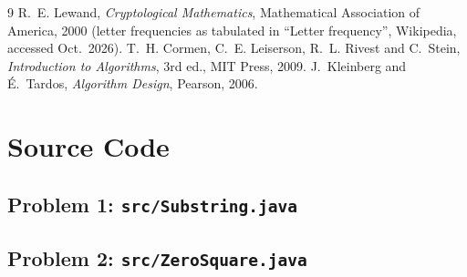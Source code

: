 \documentclass[11pt]{article}
\begin{document}
\begin{thebibliography}{9}
 R.~E. Lewand, \emph{Cryptological Mathematics}, Mathematical Association of America, 2000 (letter frequencies as tabulated in ``Letter frequency'', Wikipedia, accessed Oct.\ 2026).
 T.~H. Cormen, C.~E. Leiserson, R.~L. Rivest and C.~Stein, \emph{Introduction to Algorithms}, 3rd ed., MIT Press, 2009.
 J.~Kleinberg and \'E.~Tardos, \emph{Algorithm Design}, Pearson, 2006.
\end{thebibliography}

\appendix
\section{Source Code}
\subsection{Problem 1: \texttt{src/Substring.java}}

\subsection{Problem 2: \texttt{src/ZeroSquare.java}}

\end{document}
